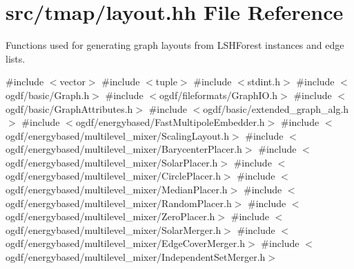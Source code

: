 \hypertarget{layout_8hh}{}\section{src/tmap/layout.hh File Reference}
\label{layout_8hh}


Functions used for generating graph layouts from L\+S\+H\+Forest instances and edge lists.  


{\ttfamily \#include $<$vector$>$}\newline
{\ttfamily \#include $<$tuple$>$}\newline
{\ttfamily \#include $<$stdint.\+h$>$}\newline
{\ttfamily \#include $<$ogdf/basic/\+Graph.\+h$>$}\newline
{\ttfamily \#include $<$ogdf/fileformats/\+Graph\+I\+O.\+h$>$}\newline
{\ttfamily \#include $<$ogdf/basic/\+Graph\+Attributes.\+h$>$}\newline
{\ttfamily \#include $<$ogdf/basic/extended\+\_\+graph\+\_\+alg.\+h$>$}\newline
{\ttfamily \#include $<$ogdf/energybased/\+Fast\+Multipole\+Embedder.\+h$>$}\newline
{\ttfamily \#include $<$ogdf/energybased/multilevel\+\_\+mixer/\+Scaling\+Layout.\+h$>$}\newline
{\ttfamily \#include $<$ogdf/energybased/multilevel\+\_\+mixer/\+Barycenter\+Placer.\+h$>$}\newline
{\ttfamily \#include $<$ogdf/energybased/multilevel\+\_\+mixer/\+Solar\+Placer.\+h$>$}\newline
{\ttfamily \#include $<$ogdf/energybased/multilevel\+\_\+mixer/\+Circle\+Placer.\+h$>$}\newline
{\ttfamily \#include $<$ogdf/energybased/multilevel\+\_\+mixer/\+Median\+Placer.\+h$>$}\newline
{\ttfamily \#include $<$ogdf/energybased/multilevel\+\_\+mixer/\+Random\+Placer.\+h$>$}\newline
{\ttfamily \#include $<$ogdf/energybased/multilevel\+\_\+mixer/\+Zero\+Placer.\+h$>$}\newline
{\ttfamily \#include $<$ogdf/energybased/multilevel\+\_\+mixer/\+Solar\+Merger.\+h$>$}\newline
{\ttfamily \#include $<$ogdf/energybased/multilevel\+\_\+mixer/\+Edge\+Cover\+Merger.\+h$>$}\newline
{\ttfamily \#include $<$ogdf/energybased/multilevel\+\_\+mixer/\+Independent\+Set\+Merger.\+h$>$}\newline
